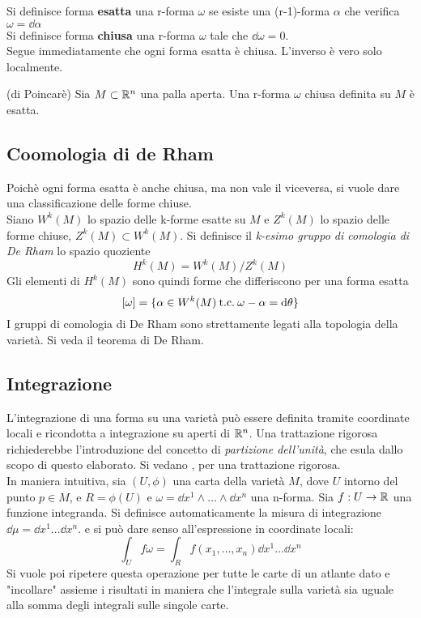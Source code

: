 Si definisce forma \textbf{esatta} una r-forma $\omega$ se esiste una
(r-1)-forma $\alpha$ che verifica $\omega = \dd \alpha$\\
Si definisce forma \textbf{chiusa} una r-forma $\omega$ tale che $\dd \omega = 0$.\\
Segue immediatamente che ogni forma esatta è chiusa. L'inverso è vero solo localmente.
\begin{lemma}{(di Poincarè)}
    Sia $M \subset \mathbb{R}^n$ una palla aperta. Una r-forma $\omega$ chiusa
    definita su $M$ è esatta.
\end{lemma}
\subsection{Coomologia di de Rham}
Poichè ogni forma esatta è anche chiusa, ma non vale il viceversa, si vuole
dare una classificazione delle forme chiuse.\\
Siano $W^k(M)$ lo spazio delle k-forme esatte su $M$ e $Z^k(M)$ lo spazio delle
forme chiuse, $Z^k(M) \subset W^k(M)$. Si definisce il \emph{k-esimo gruppo di
comologia di De Rham} lo spazio quoziente
$$
   H^k(M) = W^k(M)/Z^k(M)
$$
Gli elementi di $H^k(M)$ sono quindi forme che differiscono per una forma esatta
$$
    [\omega] = \{ \alpha \in W^k(M)\mathrm{\: t.c. \:} \omega -\alpha = \mathrm{d} \theta \}
$$
I gruppi di comologia di De Rham sono strettamente legati alla topologia della
varietà. Si veda il teorema di De Rham.
\subsection{Integrazione}
L'integrazione di una forma su una varietà può essere definita
tramite coordinate locali e ricondotta a integrazione su aperti di $\mathbb{R}^n$.
Una trattazione rigorosa richiederebbe l'introduzione del concetto di
\emph{partizione dell'unità}, che esula dallo scopo di questo elaborato.
Si vedano \cite{boothby},\cite{nakahara} per una trattazione rigorosa. \\
In maniera intuitiva, sia $(U,\phi)$ una carta della
varietà $M$, dove $U$ intorno del punto $p \in M$, e $R = \phi(U)$ e
$\omega = \dd x^1 \wedge \dots \wedge \dd x^n$ una n-forma.
Sia $f : U \to \mathbb{R}$ una funzione integranda.
Si definisce automaticamente la misura di integrazione $\dd \mu = \dd x^1 \dots \dd x^n$.
e si può dare senso all'espressione in coordinate locali:
$$
   \int_U f\omega = \int_R f(x_1,\dots,x_n) \dd x^1 \dots \dd x ^n
$$
Si vuole poi ripetere questa operazione per tutte le carte di un atlante dato e
"incollare" assieme i risultati in maniera che l'integrale sulla varietà sia uguale
alla somma degli integrali sulle singole carte.\\

